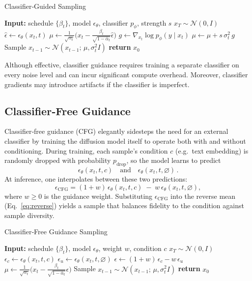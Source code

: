 \documentclass[11pt,a4paper]{article}
\begin{document}
\begin{algorithm}[htb]
\caption{Classifier‐Guided Sampling}\label{alg:clf_guidance}
\begin{algorithmic}[1]
  \STATE \textbf{Input:} schedule $\{\beta_t\}$, model $\epsilon_\theta$, classifier $p_\phi$, strength $s$
  \STATE $x_T \sim \mathcal{N}(0,I)$
    \STATE $\hat\epsilon \leftarrow \epsilon_\theta(x_t,t)$
    \STATE $\mu \leftarrow \frac{1}{\sqrt{\alpha_t}}\bigl(x_t - \tfrac{\beta_t}{\sqrt{1-\bar\alpha_t}}\hat\epsilon\bigr)$
    \STATE $g \leftarrow \nabla_{x_t}\log p_\phi(y\!\mid\!x_t)$
    \STATE $\mu \leftarrow \mu + s\,\sigma_t^2\,g$
    \STATE Sample $x_{t-1}\sim\mathcal{N}(x_{t-1};\,\mu,\sigma_t^2 I)$
  \ENDFOR
  \STATE \textbf{return} $x_0$
\end{algorithmic}
\end{algorithm}

Although effective, classifier guidance requires training a separate classifier on every noise level and can incur significant compute overhead.  Moreover, classifier gradients may introduce artifacts if the classifier is imperfect.

\subsection{Classifier‐Free Guidance}

Classifier‐free guidance (CFG) \cite{ho2022classifierfree} elegantly sidesteps the need for an external classifier by training the diffusion model itself to operate both with and without conditioning.  During training, each sample’s condition $c$ (e.g.\ text embedding) is randomly dropped with probability $p_\text{drop}$, so the model learns to predict
\[
\epsilon_\theta(x_t,t,c)\quad\text{and}\quad\epsilon_\theta(x_t,t,\varnothing)\,.
\]
At inference, one interpolates between these two predictions:
\begin{equation}\label{eq:cfg}
\epsilon_{\mathrm{CFG}}
=(1+w)\,\epsilon_\theta(x_t,t,c)\;-\;w\,\epsilon_\theta(x_t,t,\varnothing),
\end{equation}
where $w\ge0$ is the guidance weight.  Substituting $\epsilon_{\mathrm{CFG}}$ into the reverse mean (Eq.~\ref{eq:reverse}) yields a sample that balances fidelity to the condition against sample diversity.

\begin{algorithm}[htb]
\caption{Classifier‐Free Guidance Sampling}\label{alg:cfg}
\begin{algorithmic}[1]
  \STATE \textbf{Input:} schedule $\{\beta_t\}$, model $\epsilon_\theta$, weight $w$, condition $c$
  \STATE $x_T \sim \mathcal{N}(0,I)$
    \STATE $\epsilon_c \leftarrow \epsilon_\theta(x_t,t,c)$
    \STATE $\epsilon_u \leftarrow \epsilon_\theta(x_t,t,\varnothing)$
    \STATE $\epsilon \leftarrow (1+w)\,\epsilon_c - w\,\epsilon_u$
    \STATE $\mu \leftarrow \frac{1}{\sqrt{\alpha_t}}\bigl(x_t - \tfrac{\beta_t}{\sqrt{1-\bar\alpha_t}}\epsilon\bigr)$
    \STATE Sample $x_{t-1}\sim\mathcal{N}(x_{t-1};\,\mu,\sigma_t^2 I)$
  \ENDFOR
  \STATE \textbf{return} $x_0$
\end{algorithmic}
\end{algorithm}
\end{document}
